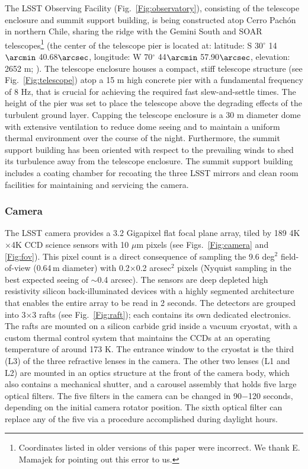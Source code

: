 The LSST Observing Facility (Fig.~\ref{Fig:observatory}),
consisting of the telescope enclosure and summit support building, is being constructed atop Cerro Pach\'{o}n in northern Chile,
sharing the ridge with the Gemini South and SOAR telescopes\footnote{Coordinates listed in older versions
of this paper were incorrect. We thank E. Mamajek for pointing out this error to us.}
(the center of the telescope pier is located at: latitude: S 30$^\circ$ 14$\arcmin$ 40.68$\arcsec$,
longitude: W 70$^\circ$ 44$\arcmin$ 57.90$\arcsec$, elevation: 2652 m;
\citealt{2012arXiv1210.1616M}).  The telescope enclosure houses a compact, stiff
telescope structure (see Fig.~\ref{Fig:telescope}) atop a 15 m high concrete pier
with a fundamental frequency of 8 Hz, that is crucial for achieving the required fast slew-and-settle times.  The height of the pier was set to place the telescope above the degrading
effects of the turbulent ground layer.  Capping the telescope
enclosure is a 30 m diameter dome with extensive ventilation to reduce
dome seeing
and to maintain a uniform thermal environment over the course of the night.  Furthermore, the summit support
building has been oriented with respect to the prevailing winds to shed its turbulence away from the
telescope enclosure.  The summit support building includes a coating chamber for recoating the three LSST mirrors and
clean room facilities for maintaining and servicing the camera.


\subsubsection{ Camera }


The LSST camera provides a 3.2 Gigapixel flat focal plane array, tiled by 189
4K$\times$4K CCD science sensors with 10 $\mu$m pixels (see Figs.~\ref{Fig:camera}
and \ref{Fig:fov}). This pixel count is a direct consequence of sampling the
9.6 deg$^2$ field-of-view (0.64\,m diameter) with 0.2$\times$0.2 arcsec$^2$
pixels (Nyquist sampling in the best expected seeing of $\sim$0.4 arcsec).
The sensors are deep depleted high resistivity silicon back-illuminated devices with
a highly segmented architecture that enables the entire array to be read in 2 seconds.
The detectors are grouped into 3$\times$3 rafts (see Fig.~\ref{Fig:raft}); each
contains its own dedicated electronics. The rafts are mounted on a silicon carbide
grid inside a vacuum cryostat, with a custom thermal control system that maintains
the CCDs at an operating temperature of around 173 K. The entrance window to the
cryostat is the third (L3) of the three refractive lenses in the camera. The other
two lenses (L1 and L2) are mounted in an optics structure at the front of the camera
body, which also contains a mechanical shutter, and a carousel assembly that holds
five large optical filters. The five filters in the camera can be changed in 90$-$120 seconds,
depending on the initial camera rotator position. The sixth optical filter can
replace any of the five via a procedure accomplished during daylight hours.

